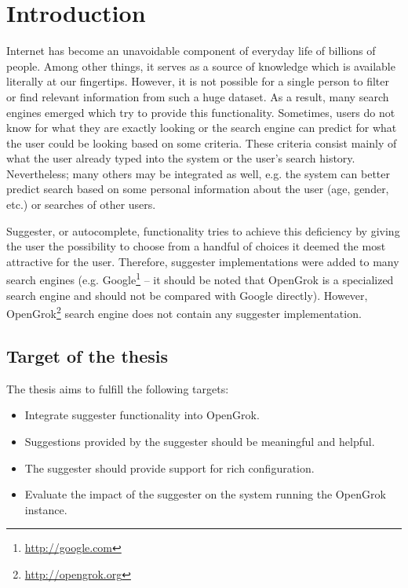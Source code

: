\chapter*{Introduction}

Internet has become an unavoidable component of everyday life of billions of people. Among other things, it serves as a
source of knowledge which is available literally at our fingertips. However, it is not possible for a single person to
filter or find relevant information from such a huge dataset. As a result, many search engines emerged which try to
provide this functionality. Sometimes, users do not know for what they are exactly looking or the search engine can
predict for what the user could be looking based on some criteria. These criteria consist mainly of what the user
already typed into the system or the user's search history. Nevertheless; many others may be integrated as well, e.g.
the system can better predict search based on some personal information about the user (age, gender, etc.) or
searches of other users.


Suggester, or autocomplete, functionality tries to achieve this deficiency by giving the user the possibility to choose
from a handful of choices it deemed the most attractive for the user. Therefore, suggester implementations were added to
many search engines (e.g. Google\footnote{\url{http://google.com}} – it should be noted that OpenGrok is a specialized
search engine and should not be compared with Google directly).
However, OpenGrok\footnote{\url{http://opengrok.org}}
search engine does not contain any suggester implementation.

\section{Target of the thesis}

The thesis aims to fulfill the following targets:
\begin{itemize}
    \item Integrate suggester functionality into OpenGrok.
    \item Suggestions provided by the suggester should be meaningful and helpful.
    \item The suggester should provide support for rich configuration.
    \item Evaluate the impact of the suggester on the system running the OpenGrok instance.
\end{itemize}

